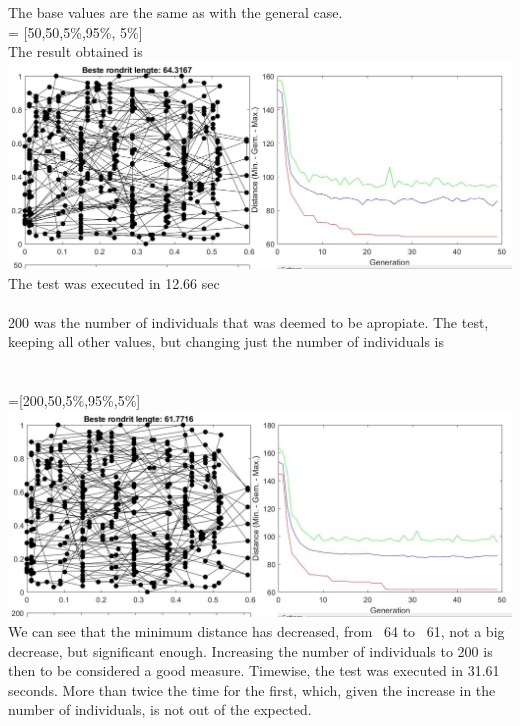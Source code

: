 The base values are the same as with the general case.\\
 = [50,50,5\%,95\%, 5\%\big]\\

The result obtained is
\includegraphics[width=\textwidth]{img/specific/xalt_edges/general_1.jpg}\\
The test was executed in 12.66 sec\\
\\
200 was the number of individuals that was deemed to be apropiate. 
The test, keeping all other values, but changing just the number of
individuals is \\
\\
\\
 =[200,50,5\%,95\%,5\%] \\
\includegraphics[width=\textwidth]{img/specific/xalt_edges/general_2.jpg}\\
We can see that the minimum distance has decreased, from ~64 to ~61, not a
big decrease, but significant enough. Increasing the number of
individuals to 200 is then to be considered a good measure. Timewise, the test was executed in 31.61 seconds. More than twice the time for the
first, which, given the increase in the number of individuals, is not out of
the expected. \\
\\
